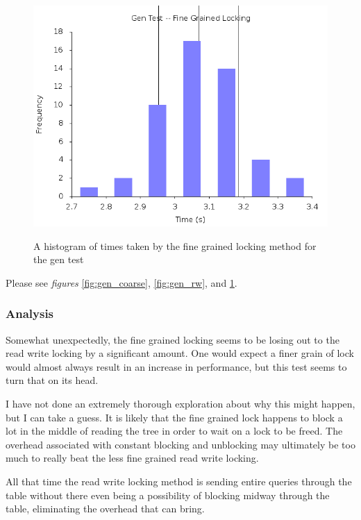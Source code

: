 \documentclass[paper=a4, fontsize=11pt]{scrartcl} %
\numberwithin{equation}{section} %
\numberwithin{figure}{section} %
\numberwithin{table}{section} %
\begin{document}
\begin{figure}[h]
  \caption{A histogram of times taken by the fine grained locking method for the gen test} 
  \centering
  \includegraphics[width=\textwidth]{gen_server_fine_final.png}
  \label{fig:gen_fine}
\end{figure}
Please see \emph{figures} \ref{fig:gen_coarse}, \ref{fig:gen_rw}, and \ref{fig:gen_fine}. 

\subsubsection{Analysis}
Somewhat unexpectedly, the fine grained locking seems to be losing out to the read write locking by a significant amount.  One would expect a finer grain of lock would almost always result in an increase in performance, but this test seems to turn that on its head.

I have not done an extremely thorough exploration about why this might happen, but I can take a guess. It is likely that the fine grained lock happens to block a lot in the middle of reading the tree in order to wait on a lock to be freed.  The overhead associated with constant blocking and unblocking may ultimately be too much to really beat the less fine grained read write locking.

All that time the read write locking method is sending entire queries through the table without there even being a possibility of blocking midway through the table, eliminating the overhead that can bring.
\end{document}
